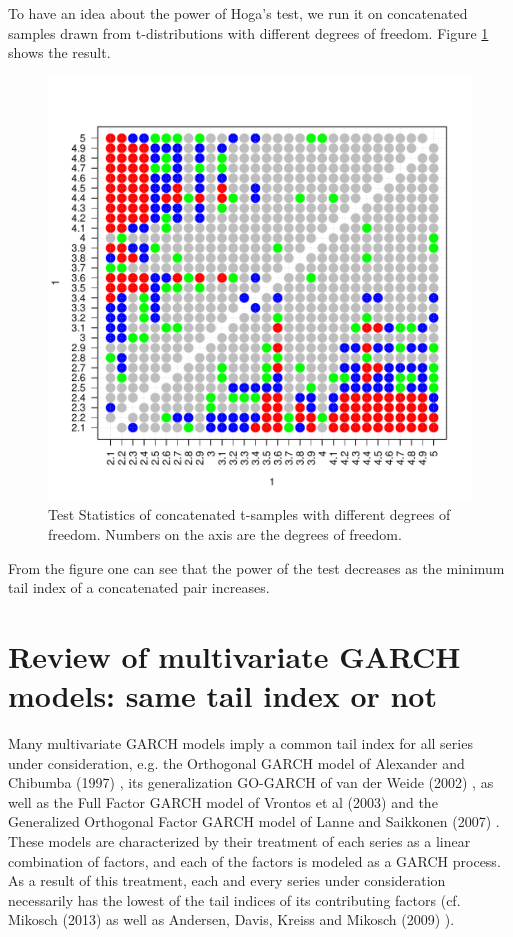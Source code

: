 \documentclass{article}
\begin{document}
To have an idea about the power of Hoga's test, we run it on
concatenated samples drawn from t-distributions with different degrees
of freedom. Figure \ref{fig:t_sim_pair} shows the result.
\begin{figure}[htb!]
  \centering
  \includegraphics[width=\textwidth, trim={1cm 1cm 1cm 2cm},
  clip]{t_sim_pair.pdf}
  \caption{Test Statistics of concatenated t-samples with different
    degrees of freedom. Numbers on the axis are the degrees of freedom.}
  \label{fig:t_sim_pair}
\end{figure}
From the figure one can see that the power of the test decreases as
the minimum tail index of a concatenated pair increases.

\section{Review of multivariate GARCH models:
  same tail index or not}
Many multivariate GARCH models imply a common tail index for all
series under consideration, e.g. the Orthogonal GARCH model of
Alexander and Chibumba (1997) \cite{alexander1997multivariate}, its
generalization GO-GARCH of van der Weide (2002) \cite{van2002go}, as
well as the Full Factor GARCH model of Vrontos et al (2003)
\cite{vrontos2003full} and the Generalized Orthogonal Factor GARCH
model of Lanne and Saikkonen (2007) \cite{lanne2007modeling}. These
models are characterized by their treatment of each series as a linear
combination of factors, and each of the factors is modeled as a GARCH
process. As a result of this treatment, each and every series under
consideration necessarily has the lowest of the tail indices of its
contributing factors (cf. Mikosch (2013) \cite{Mikosch2013} as well
as Andersen, Davis, Kreiss and Mikosch (2009)
\cite{andersen2009handbook}).
\end{document}
